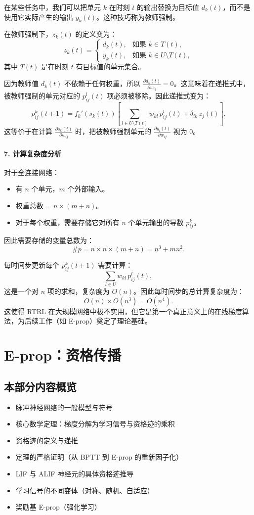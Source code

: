 \documentclass[journal,12pt,onecolumn]{IEEEtran}
\begin{document}
在某些任务中，我们可以把单元 \(k\) 在时刻 \(t\) 的输出替换为目标值 \(d_k(t)\)，而不是使用它实际产生的输出 \(y_k(t)\)。这种技巧称为教师强制。

在教师强制下，\(z_k(t)\) 的定义变为：
\[
z_k(t) = 
\begin{cases}
d_k(t), & \text{如果 } k \in T(t),\\
y_k(t), & \text{如果 } k \in U \setminus T(t),
\end{cases}
\]
其中 \(T(t)\) 是在时刻 \(t\) 有目标值的单元集合。

因为教师值 \(d_k(t)\) 不依赖于任何权重，所以 \(\frac{\partial d_k(t)}{\partial w_{ij}} = 0\)。这意味着在递推式中，被教师强制的单元对应的 \(p_{ij}^l(t)\) 项必须被移除。因此递推式变为：
\[
p_{ij}^k(t+1) = f_k'(s_k(t)) \left[ \sum_{l \in U \setminus T(t)} w_{kl} \, p_{ij}^l(t) + \delta_{ik} \, z_j(t) \right]. \tag{6.1}
\]
这等价于在计算 \(\frac{\partial s_k(t)}{\partial w_{ij}}\) 时，把被教师强制单元的 \(\frac{\partial y_l(t)}{\partial w_{ij}}\) 视为 0。

\paragraph{7. 计算复杂度分析}

对于全连接网络：
\begin{itemize}
    \item 有 \(n\) 个单元，\(m\) 个外部输入。
    \item 权重总数 = \(n \times (m+n)\)。
    \item 对于每个权重，需要存储它对所有 \(n\) 个单元输出的导数 \(p_{ij}^k\)。
\end{itemize}

因此需要存储的变量总数为：
\[
\#p = n \times n \times (m+n) = n^3 + m n^2. \tag{7.1}
\]

每时间步更新每个 \(p_{ij}^k(t+1)\) 需要计算：
\[
\sum_{l \in U} w_{kl} \, p_{ij}^l(t),
\]
这是一个对 \(n\) 项的求和，复杂度为 \(O(n)\)。因此每时间步的总计算复杂度为：
\[
O(n) \times O(n^3) = O(n^4). \tag{7.2}
\]
这使得 RTRL 在大规模网络中极不实用，但它是第一个真正意义上的在线梯度算法，为后续工作（如 E-prop）奠定了理论基础。

\section{E-prop：资格传播}

\subsection*{本部分内容概览}
\begin{itemize}
    \item 脉冲神经网络的一般模型与符号
    \item 核心数学定理：梯度分解为学习信号与资格迹的乘积
    \item 资格迹的定义与递推
    \item 定理的严格证明（从 BPTT 到 E-prop 的重新因子化）
    \item LIF 与 ALIF 神经元的具体资格迹推导
    \item 学习信号的不同变体（对称、随机、自适应）
    \item 奖励基 E-prop（强化学习）
\end{itemize}
\end{document}
